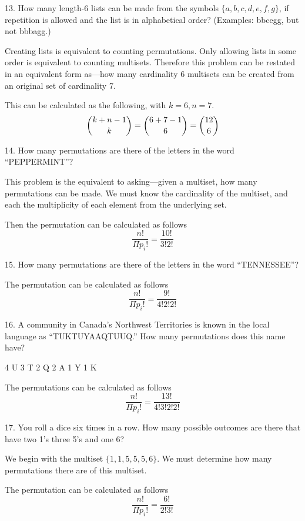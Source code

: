 \documentclass{hippoidC}
\begin{document}
\begin{prooflist}{13. How many length-6 lists can be made from the symbols $\{a,
    b, c, d, e, f, g\}$, if repetition is allowed and the list is in
    alphabetical order? (Examples: bbcegg, but not bbbagg.)}
\item Creating lists is equivalent to counting permutations. Only allowing lists
    in some order is equivalent to counting multisets. Therefore this problem
    can be restated in an equivalent form as---how many cardinality 6 multisets
    can be created from an original set of cardinality 7.
\item This can be calculated as the following, with $k=6, n=7$.
    $$ \dbinom{k+n-1}{k} = \dbinom{6+7-1}{6}=\dbinom{12}{6}$$
\end{prooflist}

\begin{prooflist}{14. How many permutations are there of the letters in the word “PEPPERMINT”?}
\item This problem is the equivalent to asking---given a multiset, how many
    permutations can be made.  We must know the cardinality of the multiset, and each
    the multiplicity of each element from the underlying set.
\item Then the permutation can be calculated as follows
    $$ \dfrac{n!}{\Pi{p_i}!} = \dfrac{10!}{3!2!}$$
\end{prooflist}

\begin{prooflist}{15. How many permutations are there of the letters in the word “TENNESSEE”?}
\item The permutation can be calculated as follows
    $$ \dfrac{n!}{\Pi{p_i}!} = \dfrac{9!}{4!2!2!}$$
\end{prooflist}

\begin{prooflist}{16. A community in Canada’s Northwest Territories is known in the local language as “TUKTUYAAQTUUQ.” How many permutations does this name have?}
\item
      4 U
      3 T
      2 Q
      2 A
      1 Y
      1 K
\item The permutations can be calculated as follows
    $$ \dfrac{n!}{\Pi{p_i}!} = \dfrac{13!}{4!3!2!2!}$$
\end{prooflist}

\begin{prooflist}{17. You roll a dice six times in a row. How many possible outcomes are there that have two 1’s three 5’s and one 6?}
\item We begin with the multiset $\{1, 1, 5, 5, 5, 6\}$. We must determine how
    many permutations there are of this multiset.
\item The permutation can be calculated as follows
    $$ \dfrac{n!}{\Pi{p_i}!} = \dfrac{6!}{2!3!}$$
\end{prooflist}
\end{document}
